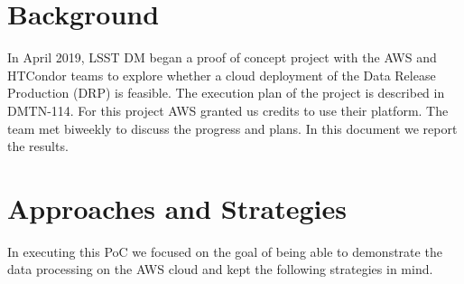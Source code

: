 \section{Background}

In April 2019, LSST DM began a proof of concept project with the AWS and HTCondor teams to explore whether a cloud deployment of the Data Release Production (DRP) is feasible.
The execution plan of the project is described in DMTN-114.
For this project AWS granted us credits to use their platform.
The team met biweekly to discuss the progress and plans.
In this document we report the results.


\section{Approaches and Strategies}

In executing this PoC we focused on the goal of being able to demonstrate the data processing on the AWS cloud and kept the following strategies in mind.

